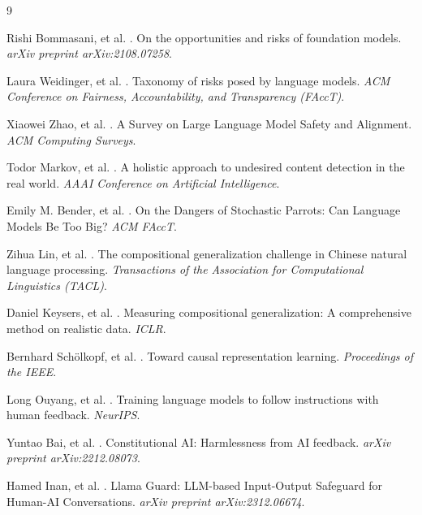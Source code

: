 \documentclass{acmart}
\begin{document}

\begin{thebibliography}{9}

Rishi Bommasani, et al.
.
\newblock On the opportunities and risks of foundation models.
\newblock \emph{arXiv preprint arXiv:2108.07258}.

Laura Weidinger, et al.
.
\newblock Taxonomy of risks posed by language models.
\newblock \emph{ACM Conference on Fairness, Accountability, and Transparency (FAccT)}.

Xiaowei Zhao, et al.
.
\newblock A Survey on Large Language Model Safety and Alignment.
\newblock \emph{ACM Computing Surveys}.

Todor Markov, et al.
.
\newblock A holistic approach to undesired content detection in the real world.
\newblock \emph{AAAI Conference on Artificial Intelligence}.

Emily M. Bender, et al.
.
\newblock On the Dangers of Stochastic Parrots: Can Language Models Be Too Big?
\newblock \emph{ACM FAccT}.

Zihua Lin, et al.
.
\newblock The compositional generalization challenge in Chinese natural language processing.
\newblock \emph{Transactions of the Association for Computational Linguistics (TACL)}.

Daniel Keysers, et al.
.
\newblock Measuring compositional generalization: A comprehensive method on realistic data.
\newblock \emph{ICLR}.

Bernhard Schölkopf, et al.
.
\newblock Toward causal representation learning.
\newblock \emph{Proceedings of the IEEE}.

Long Ouyang, et al.
.
\newblock Training language models to follow instructions with human feedback.
\newblock \emph{NeurIPS}.

Yuntao Bai, et al.
.
\newblock Constitutional AI: Harmlessness from AI feedback.
\newblock \emph{arXiv preprint arXiv:2212.08073}.

Hamed Inan, et al.
.
\newblock Llama Guard: LLM-based Input-Output Safeguard for Human-AI Conversations.
\newblock \emph{arXiv preprint arXiv:2312.06674}.


\end{thebibliography}
\end{document}

